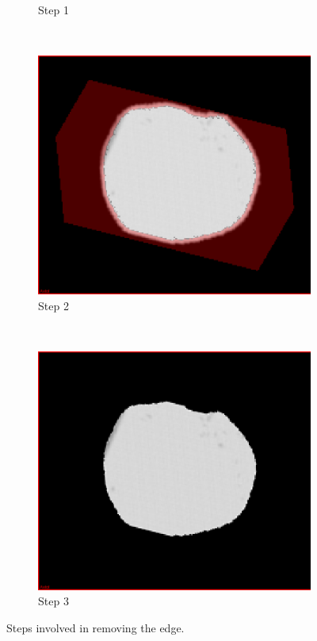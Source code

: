 \begin{figure}[h]
\begin{subfigure}[b]{0.45\textwidth}
    \caption{Step 1}
    \label{fig:erosion1}
  \end{subfigure}  
  ~ %
  \begin{subfigure}[b]{0.45\textwidth}
    \includegraphics[width=\textwidth]{images/erosion/erosion_2.png}
    \caption{Step 2}
    \label{fig:erosion2}
  \end{subfigure}%
  ~ %
  \begin{subfigure}[b]{0.45\textwidth}
    \includegraphics[width=\textwidth]{images/erosion/erosion_3.png}
    \caption{Step 3}
    \label{fig:erosion3}
  \end{subfigure}  
  \caption{Steps involved in removing the edge.}\label{fig:erosionoverview}
\end{figure}

